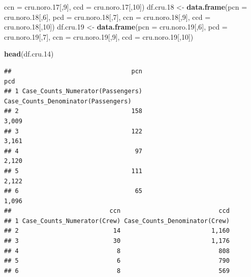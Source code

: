 \documentclass[
  11,
]{book}
\newenvironment{Shaded}{\begin{snugshade}}{\end{snugshade}}
\newcommand{\AttributeTok}[1]{\textcolor[rgb]{0.27,0.27,0.27}{#1}}
\newcommand{\DecValTok}[1]{\textcolor[rgb]{0.06,0.06,0.06}{#1}}
\newcommand{\FloatTok}[1]{\textcolor[rgb]{0.06,0.06,0.06}{#1}}
\newcommand{\FunctionTok}[1]{\textcolor[rgb]{0.27,0.27,0.27}{\textbf{#1}}}
\newcommand{\NormalTok}[1]{#1}
\newcommand{\OtherTok}[1]{\textcolor[rgb]{0.37,0.37,0.37}{#1}}
\begin{document}
\begin{Shaded}
\begin{Highlighting}[]
                        \AttributeTok{ccn =}\NormalTok{ cru.noro}\FloatTok{.17}\NormalTok{[,}\DecValTok{9}\NormalTok{],}
                        \AttributeTok{ccd =}\NormalTok{ cru.noro}\FloatTok{.17}\NormalTok{[,}\DecValTok{10}\NormalTok{])}
\NormalTok{df.cru}\FloatTok{.18} \OtherTok{\textless{}{-}} \FunctionTok{data.frame}\NormalTok{(}\AttributeTok{pcn =}\NormalTok{ cru.noro}\FloatTok{.18}\NormalTok{[,}\DecValTok{6}\NormalTok{],}
                        \AttributeTok{pcd =}\NormalTok{ cru.noro}\FloatTok{.18}\NormalTok{[,}\DecValTok{7}\NormalTok{],}
                        \AttributeTok{ccn =}\NormalTok{ cru.noro}\FloatTok{.18}\NormalTok{[,}\DecValTok{9}\NormalTok{],}
                        \AttributeTok{ccd =}\NormalTok{ cru.noro}\FloatTok{.18}\NormalTok{[,}\DecValTok{10}\NormalTok{])}
\NormalTok{df.cru}\FloatTok{.19} \OtherTok{\textless{}{-}} \FunctionTok{data.frame}\NormalTok{(}\AttributeTok{pcn =}\NormalTok{ cru.noro}\FloatTok{.19}\NormalTok{[,}\DecValTok{6}\NormalTok{],}
                        \AttributeTok{pcd =}\NormalTok{ cru.noro}\FloatTok{.19}\NormalTok{[,}\DecValTok{7}\NormalTok{],}
                        \AttributeTok{ccn =}\NormalTok{ cru.noro}\FloatTok{.19}\NormalTok{[,}\DecValTok{9}\NormalTok{],}
                        \AttributeTok{ccd =}\NormalTok{ cru.noro}\FloatTok{.19}\NormalTok{[,}\DecValTok{10}\NormalTok{])}

\FunctionTok{head}\NormalTok{(df.cru}\FloatTok{.14}\NormalTok{)}
\end{Highlighting}
\end{Shaded}

\begin{verbatim}
##                                 pcn                                 pcd
## 1 Case_Counts_Numerator(Passengers) Case_Counts_Denominator(Passengers)
## 2                               158                               3,009
## 3                               122                               3,161
## 4                                97                               2,120
## 5                               111                               2,122
## 6                                65                               1,096
##                           ccn                           ccd
## 1 Case_Counts_Numerator(Crew) Case_Counts_Denominator(Crew)
## 2                          14                         1,160
## 3                          30                         1,176
## 4                           8                           808
## 5                           6                           790
## 6                           8                           569
\end{verbatim}
\end{document}
